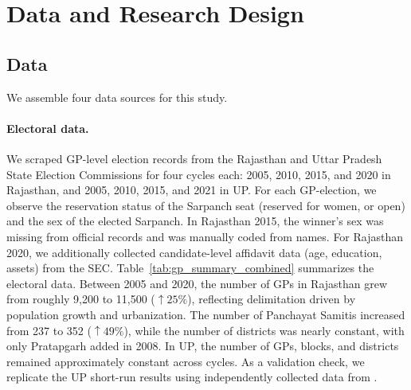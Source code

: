 \documentclass[12pt]{article}
\begin{document}
\section{Data and Research Design}
\subsection{Data}

We assemble four data sources for this study.

\paragraph{Electoral data.} We scraped GP-level election records from the Rajasthan and Uttar Pradesh State Election Commissions for four cycles each: 2005, 2010, 2015, and 2020 in Rajasthan, and 2005, 2010, 2015, and 2021 in UP. For each GP-election, we observe the reservation status of the Sarpanch seat (reserved for women, or open) and the sex of the elected Sarpanch. In Rajasthan 2015, the winner's sex was missing from official records and was manually coded from names. For Rajasthan 2020, we additionally collected candidate-level affidavit data (age, education, assets) from the SEC. Table~\ref{tab:gp_summary_combined} summarizes the electoral data. Between 2005 and 2020, the number of GPs in Rajasthan grew from roughly 9,200 to 11,500 ($\uparrow 25\%$), reflecting delimitation driven by population growth and urbanization. The number of Panchayat Samitis increased from 237 to 352 ($\uparrow 49\%$), while the number of districts was nearly constant, with only Pratapgarh added in 2008. In UP, the number of GPs, blocks, and districts remained approximately constant across cycles. As a validation check, we replicate the UP short-run results using independently collected data from \citet{weaver_data}.
\end{document}
